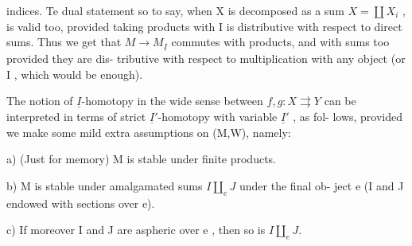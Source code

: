 indices.  Te dual statement so to say,  when X is decomposed as a sum
$X = \coprod X_i$ ,  is valid too,  provided taking products with I is distributive
with respect to  direct sums.  Thus we get that $M \to M_{\underline{I}}$  commutes with %
   products,  and with   sums too provided they are dis-%
tributive with respect to multiplication with any object  (or  I ,
which would be enough).

The notion of $\underline{I}$-homotopy in the wide sense between $f,g\colon X \rightrightarrows Y$ can
be interpreted in terms of strict $\underline{I}'$-homotopy with variable $\underline{I}'$ ,  as fol-%
lows,  provided we make some mild extra assumptions on (M,W), namely:

a)  (Just for memory)  M is stable under finite products.

b)  M is stable under amalgamated sums  $I \amalg_e J$  under the final ob-%
ject e (I and J endowed with sections over e).

c)  If moreover I and J are aspheric over e ,  then so is $I \amalg_e J$.


